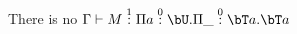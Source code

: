 \documentclass[12pt,a4paper]{article}
\begin{document}
There is no $\Gamma \vdash M \overset{1}{:}\Pi a \overset{0}{:} \bU . \Pi \_ \overset{0}{:} \bT a . \bT a$







%
\printbibliography
\end{document}
